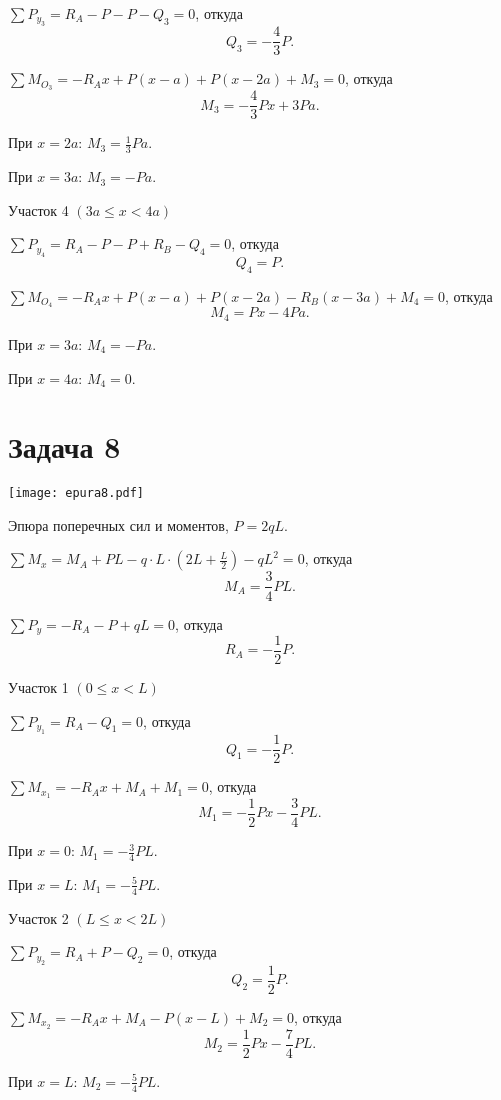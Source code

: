 $\sum P_{y_3} = R_A - P - P - Q_3 = 0$,
откуда
\[
    Q_3 = -\frac{4}{3}P.
\]

$\sum M_{O_3} = -R_A x + P (x - a) + P (x - 2a) + M_3 = 0$,
откуда
\[
    M_3 = -\frac{4}{3}Px + 3Pa.
\]

При $x = 2 a$: $M_3 = \frac{1}{3} Pa$.

При $x = 3 a$: $M_3 = -Pa$.

Участок 4 $\left(3a \le x < 4a\right)$

$\sum P_{y_4} = R_A - P - P + R_B - Q_4 = 0$,
откуда
\[
    Q_4 = P.
\]

$\sum M_{O_4} = -R_A x + P (x - a) + P (x - 2a) - R_B (x - 3a) + M_4 = 0$,
откуда
\[
    M_4 = Px - 4Pa.
\]

При $x = 3 a$: $M_4 = -Pa$.

При $x = 4 a$: $M_4 = 0$.

\newpage


\section{Задача 8}

\begin{floatingfigure}[r]{0.5\textwidth}
    \centering
    \texttt{[image: epura8.pdf]}
    \caption{Эпюра поперечных сил и моментов, $P = 2 q L$.}
    \label{fig:chap1-epura8}
\end{floatingfigure}

$\sum M_x = M_A + PL - q \cdot L \cdot \left(2L + \frac{L}{2}\right) - qL^2 = 0$,
откуда
\[
    M_A = \frac{3}{4}PL.
\]

$\sum P_y = -R_A - P + qL = 0$,
откуда
\[
    R_A = -\frac{1}{2}P.
\]

Участок 1 $\left(0 \le x < L\right)$

$\sum P_{y_1} = R_A - Q_1 = 0$,
откуда
\[
    Q_1 = -\frac{1}{2}P.
\]

$\sum M_{x_1} = -R_A x + M_A + M_1 = 0$,
откуда
\[
    M_1 = -\frac{1}{2}Px - \frac{3}{4}PL.
\]

При $x = 0$: $M_1 = -\frac{3}{4}PL$.

При $x = L$: $M_1 = -\frac{5}{4}PL$.

Участок 2 $\left(L \le x < 2L\right)$

$\sum P_{y_2} = R_A + P - Q_2 = 0$,
откуда
\[
    Q_2 = \frac{1}{2}P.
\]

$\sum M_{x_2} = -R_A x + M_A - P(x - L) + M_2 = 0$,
откуда
\[
    M_2 = \frac{1}{2}Px - \frac{7}{4}PL.
\]

При $x = L$: $M_2 = -\frac{5}{4}PL$.

